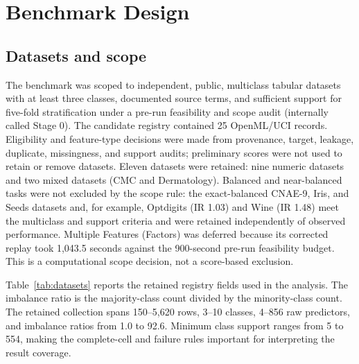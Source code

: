 \documentclass[10pt]{article}
\begin{document}
\section{Benchmark Design}
\label{sec:design}

\subsection{Datasets and scope}

The benchmark was scoped to independent, public, multiclass tabular datasets with at least three classes, documented source terms, and sufficient support for five-fold stratification under a pre-run feasibility and scope audit (internally called Stage 0). The candidate registry contained 25 OpenML/UCI records. Eligibility and feature-type decisions were made from provenance, target, leakage, duplicate, missingness, and support audits; preliminary scores were not used to retain or remove datasets. Eleven datasets were retained: nine numeric datasets and two mixed datasets (CMC and Dermatology). Balanced and near-balanced tasks were not excluded by the scope rule: the exact-balanced CNAE-9, Iris, and Seeds datasets and, for example, Optdigits (IR 1.03) and Wine (IR 1.48) meet the multiclass and support criteria and were retained independently of observed performance. Multiple Features (Factors) was deferred because its corrected replay took 1,043.5 seconds against the 900-second pre-run feasibility budget. This is a computational scope decision, not a score-based exclusion.

Table~\ref{tab:datasets} reports the retained registry fields used in the analysis. The imbalance ratio is the majority-class count divided by the minority-class count. The retained collection spans 150--5,620 rows, 3--10 classes, 4--856 raw predictors, and imbalance ratios from 1.0 to 92.6. Minimum class support ranges from 5 to 554, making the complete-cell and failure rules important for interpreting the result coverage.
\end{document}
